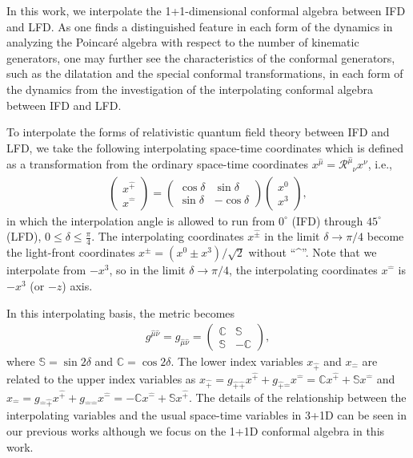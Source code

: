 \documentclass[%
 reprint,
superscriptaddress,
 amsmath,amssymb,
 aps,
]{revtex4-2}
\newcommand{\muT}{\hat{\mu}}
\newcommand{\itP}[1]{\hat{#1}}
\begin{document}
In this work, we interpolate the 1+1-dimensional conformal algebra between IFD and LFD. As one finds a distinguished feature in each form of the dynamics in analyzing the Poincar\'e algebra with respect to the number of kinematic generators, one may further see the characteristics of the conformal generators, such as the dilatation and the special conformal transformations, in each form of the dynamics from the investigation of the interpolating conformal algebra between IFD and LFD.

To interpolate the forms of relativistic quantum field theory between IFD and LFD, we take the following interpolating space-time coordinates  \cite{Ji2001, Hornbostel1992, Ji1996, Ji2012, Ji2015EM, Ji2015SP, Ji2018QED, Ji2021QCD} which is defined as a transformation from the ordinary space-time coordinates $x^{\muT}=\mathcal{R}^{\muT}_{\phantom{\mu}{\nu}}x^{\nu}$, i.e.,
\begin{align}\label{eqn:interpolation_angle_definition}
  \begin{pmatrix}
    x^{\hat{+}}\\
    x^{\hat{-}}
  \end{pmatrix}=
  \begin{pmatrix}
    \cos\delta  & \sin\delta \\
    \sin\delta  & -\cos\delta
  \end{pmatrix}
  \begin{pmatrix}
    x^{0}\\
    x^{3}
  \end{pmatrix},
\end{align}
in which the interpolation angle is allowed to run from $0^\circ$ (IFD) through $45^\circ$ (LFD), $0\le \delta \le \frac{\pi}{4}$. The interpolating coordinates $x^{\itP{\pm}}$ in the limit $\delta\rightarrow\pi/4$ become the light-front coordinates $x^{\pm}=(x^{0}\pm x^{3})/\sqrt{2}$ without  ``\textasciicircum''. Note that we interpolate from $-x^3$, so in the limit $\delta\rightarrow\pi/4$, the interpolating coordinates $x^{\itP{-}}$ is $-x^3$ (or $-z$) axis. 

 In this interpolating basis, the metric becomes
\begin{align}\label{eqn:g_munu_interpolation}
  g^{\hat{\mu}\hat{\nu}}
  = g_{\hat{\mu}\hat{\nu}}
  =
  \begin{pmatrix}
    \mathbb{C}  & \mathbb{S} \\
    \mathbb{S}  & -\mathbb{C}
  \end{pmatrix},
\end{align}
where $\mathbb{S}=\sin2\delta$ and $\mathbb{C}=\cos2\delta$. The lower index variables $x_{\hat{+}}$ and $x_{\hat{-}}$ are related to the upper index variables as $x_{\hat{+}}=g_{\hat{+}\hat{+}}x^{\hat{+}}+g_{\hat{+}\hat{-}}x^{\hat{-}}=\mathbb{C}x^{\hat{+}}+\mathbb{S}x^{\hat{-}}$ and $x_{\hat{-}}=g_{\hat{-}\hat{+}}x^{\hat{+}}+g_{\hat{-}\hat{-}}x^{\hat{-}}=-\mathbb{C}x^{\hat{-}}+\mathbb{S}x^{\hat{+}}$.
The details of the relationship between the
interpolating variables and the usual space-time variables
in 3+1D can be seen in our previous works  \cite{Ji2001, Hornbostel1992, Ji1996, Ji2012, Ji2015EM, Ji2015SP, Ji2018QED, Ji2021QCD} although we focus on the 1+1D conformal algebra in this work.
\end{document}
